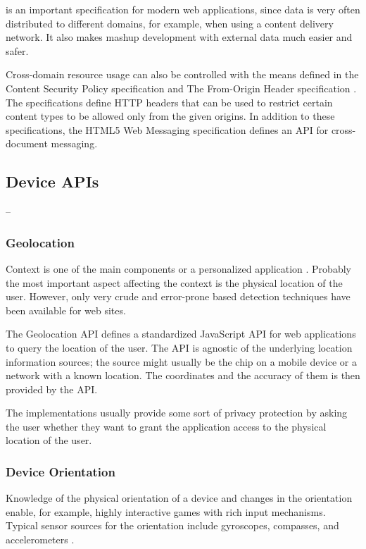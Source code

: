  is an important specification for modern web applications,
since data is very often distributed to different domains, for
example, when using a content delivery network. It also makes mashup
development with external data much easier and safer.

Cross-domain resource usage can also be controlled with the means
defined in the Content Security Policy specification
\cite{ContentSecurityPolicy} and The From-Origin Header specification
\cite{FromOriginHeader}. The specifications define HTTP headers that
can be used to restrict certain content types to be allowed only from
the given origins. In addition to these specifications, the HTML5 Web
Messaging specification \cite{WebMessaging} defines an API for
cross-document messaging.

\subsection{Device APIs}

--

\subsubsection{Geolocation}

Context is one of the main components or a personalized application
\cite{fling2009mobile}. Probably the most important aspect affecting
the context is the physical location of the user. However, only very
crude and error-prone  based detection techniques have been
available for web sites.

The Geolocation API defines a standardized JavaScript API for web
applications to query the location of the user. The API is agnostic of
the underlying location information sources; the source might usually
be the  chip on a mobile device or a  network
with a known location. The coordinates and the accuracy of them is
then provided by the API. \cite{geolocationAPI}

The implementations usually provide some sort of privacy protection by
asking the user whether they want to grant the application access to
the physical location of the user.

\subsubsection{Device Orientation}

Knowledge of the physical orientation of a device and changes in the
orientation enable, for example, highly interactive games with rich
input mechanisms. Typical sensor sources for the orientation include
gyroscopes, compasses, and accelerometers \cite{DeviceOrientation}.

